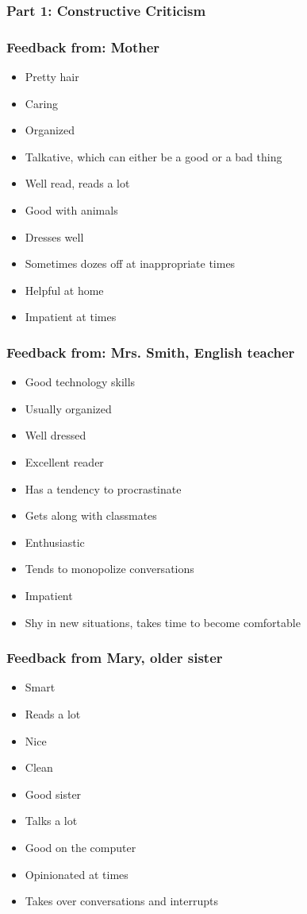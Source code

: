 \subsubsection*{Part 1: Constructive Criticism}
\subsubsection*{Feedback from: Mother}
\begin{itemize}[leftmargin=1.0cm]
	\item Pretty hair
	\item Caring
	\item Organized
	\item Talkative, which can either be a good or a bad thing
	\item Well read, reads a lot
	\item Good with animals
	\item Dresses well
	\item Sometimes dozes off at inappropriate times
	\item Helpful at home
	\item Impatient at times
\end{itemize}
\subsubsection*{Feedback from: Mrs. Smith, English teacher}
\begin{itemize}[leftmargin=1.0cm]
	\item Good technology skills
	\item Usually organized
	\item Well dressed
	\item Excellent reader
	\item Has a tendency to procrastinate
	\item Gets along with classmates
	\item Enthusiastic
	\item Tends to monopolize conversations
	\item Impatient
	\item Shy in new situations, takes time to become comfortable
\end{itemize}
\subsubsection*{Feedback from Mary, older sister}
\begin{itemize}[leftmargin=1.0cm]
	\item Smart
	\item Reads a lot
	\item Nice
	\item Clean
	\item Good sister
	\item Talks a lot
	\item Good on the computer
	\item Opinionated at times
	\item Takes over conversations and interrupts
\end{itemize}

